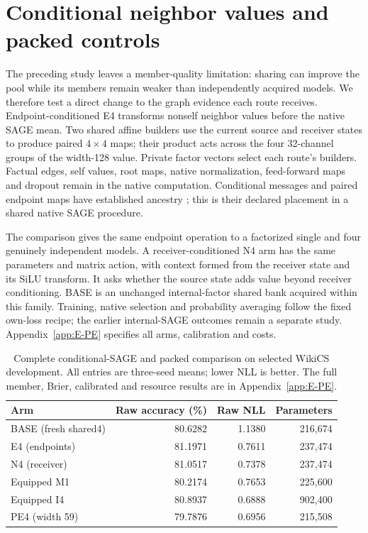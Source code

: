 \section{Conditional neighbor values and packed controls}\label{sec:conditional-values}
The preceding study leaves a member-quality limitation: sharing can improve the pool while its members remain weaker than independently acquired models. We therefore test a direct change to the graph evidence each route receives. Endpoint-conditioned E4 transforms nonself neighbor values before the native SAGE mean. Two shared affine builders use the current source and receiver states to produce paired $4\times4$ maps; their product acts across the four 32-channel groups of the width-128 value. Private factor vectors select each route's builders. Factual edges, self values, root maps, native normalization, feed-forward maps and dropout remain in the native computation. Conditional messages and paired endpoint maps have established ancestry \citep{simonovsky2017ecc,brockschmidt2020film,bodnar2022sheaf,bourgerie2026deepnsd}; this is their declared placement in a shared native SAGE procedure.

The comparison gives the same endpoint operation to a factorized single and four genuinely independent models. A receiver-conditioned N4 arm has the same parameters and matrix action, with context formed from the receiver state and its SiLU transform. It asks whether the source state adds value beyond receiver conditioning. BASE is an unchanged internal-factor shared bank acquired within this family. Training, native selection and probability averaging follow the fixed own-loss recipe; the earlier internal-SAGE outcomes remain a separate study. Appendix~\ref{app:E-PE} specifies all arms, calibration and costs.

\begin{table}[t]
\centering\small\setlength{\tabcolsep}{6pt}
\caption{Complete conditional-SAGE and packed comparison on selected WikiCS development. All entries are three-seed means; lower NLL is better. The full member, Brier, calibrated and resource results are in Appendix~\ref{app:E-PE}.}
\label{tab:E-PE-main}
\begin{tabular}{lrrr}
\toprule
Arm & Raw accuracy (\%) & Raw NLL & Parameters\\
\midrule
BASE (fresh shared4) & 80.6282 & 1.1380 & 216,674\\
E4 (endpoints) & 81.1971 & 0.7611 & 237,474\\
N4 (receiver) & 81.0517 & 0.7378 & 237,474\\
Equipped M1 & 80.2174 & 0.7653 & 225,600\\
Equipped I4 & 80.8937 & 0.6888 & 902,400\\
PE4 (width 59) & 79.7876 & 0.6956 & 215,508\\
\bottomrule\end{tabular}\end{table}

